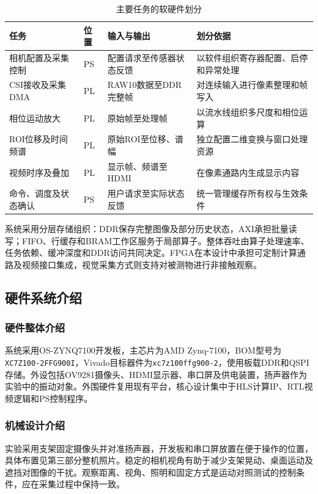 \begin{table}[htbp]
\centering\small
\caption{主要任务的软硬件划分}\label{tab:partition}
\begin{tabularx}{\linewidth}{@{}p{2.6cm}p{1.3cm}X X@{}}
\toprule
任务 & 位置 & 输入与输出 & 划分依据 \\
\midrule
相机配置及采集控制 & PS & 配置请求至传感器状态反馈 & 以软件组织寄存器配置、启停和异常处理 \\
CSI接收及采集DMA & PL & RAW10数据至DDR完整帧 & 对连续输入进行像素整理和帧写入 \\
相位运动放大 & PL & 原始帧至处理帧 & 以流水线组织多尺度和相位运算 \\
ROI位移及时间频谱 & PL & 原始ROI至位移、谱幅 & 独立配置二维变换与窗口处理资源 \\
视频时序及叠加 & PL & 显示帧、频谱至HDMI & 在像素通路内生成显示内容 \\
命令、调度及状态确认 & PS & 用户请求至实际状态反馈 & 统一管理缓存所有权与生效条件 \\
\bottomrule
\end{tabularx}
\end{table}

系统采用分层存储组织：DDR保存完整图像及部分历史状态，AXI承担批量读写；FIFO、行缓存和BRAM工作区服务于局部算子。整体吞吐由算子处理速率、任务依赖、缓冲深度和DDR访问共同决定。FPGA在本设计中承担可定制计算通路及视频接口集成，视觉采集方式则支持对被测物进行非接触观察。

\subsection{硬件系统介绍}
\subsubsection{硬件整体介绍}
系统采用OS-ZYNQ7100开发板，主芯片为AMD Zynq-7100，BOM型号为\texttt{XC7Z100-2FFG900I}，Vivado目标器件为\texttt{xc7z100ffg900-2}，使用板载DDR和QSPI存储。外设包括OV9281摄像头、HDMI显示器、串口屏及供电装置，扬声器作为实验中的振动对象。外围硬件复用现有平台，核心设计集中于HLS计算IP、RTL视频逻辑和PS控制程序。

\subsubsection{机械设计介绍}
实验采用支架固定摄像头并对准扬声器，开发板和串口屏放置在便于操作的位置，具体布置见第三部分整机照片。稳定的相机视角有助于减少支架晃动、桌面运动及遮挡对图像的干扰。观察距离、视角、照明和固定方式是运动对照测试的控制条件，应在采集过程中保持一致。

